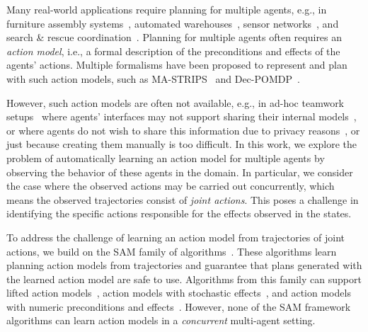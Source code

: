\documentclass[letterpaper]{article} %
\theoremstyle{definition}
\theoremstyle{remark}
\newcommand{\sam}{\ac{SAM}\xspace}
\newcommand{\roni}[1]{{\textcolor{red}{[Roni: #1]}}}
\begin{document}
Many real-world applications require planning for multiple agents, e.g., in furniture assembly systems~\cite{knepper2013ikeabot}, automated warehouses~\cite{azadeh2019robotized}, sensor networks~\cite{lesser2003distributed}, and search \& rescue coordination~\cite{allouche2010multi}. 
Planning for multiple agents often requires an \emph{action model}, i.e., a formal description of the preconditions and effects of the agents' actions.   
Multiple formalisms have been proposed to represent and plan with such action models, such as MA-STRIPS~\cite{brafman2013complexity} and Dec-POMDP~\cite{bernstein2002complexity,tambe1997towards}.  

However, such action models are often not available, e.g., in ad-hoc teamwork setups~\cite{barrett2012analysis} where agents' interfaces may not support sharing their internal models~\cite{verma2020asking}, 
or where agents do not wish to share this information due to privacy reasons~\cite{brafman2013complexity,maliah2016collaborative}, 
or just because creating them manually is too difficult. 
In this work, we explore the problem of automatically learning an action model for multiple agents by observing the behavior of these agents in the domain. In particular, we consider the case where the observed actions may be carried out concurrently, which means the observed trajectories consist of \emph{joint actions}. 
This poses a challenge in identifying the specific actions responsible for the effects observed in the states.



To address the challenge of learning an action model from trajectories of joint actions, we build on the \sam family of algorithms~\cite{stern2017efficientAndSafe,juba2021safe,juba2022learning,mordoch2023learning}. 
These algorithms learn planning action models from trajectories and guarantee that plans generated with the learned action model are safe to use. 
Algorithms from this family can support lifted action models~, action models with stochastic effects~, and action models with numeric preconditions and effects~. 
However, none of the \sam framework algorithms can learn action models in a \emph{concurrent} multi-agent setting. 
\end{document}
